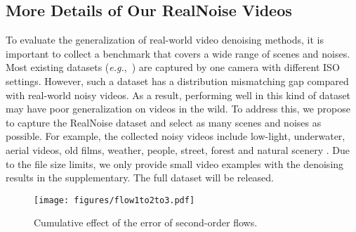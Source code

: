 \documentclass[10pt,twocolumn,letterpaper]{article}
\def\eg{\mbox{\textit{e.g.}, }}
\newlength \g
\begin{document}
\begin{table}[h!]
\caption{Generalization to different kinds of noise on REDS4.}
  \vspace{1mm}
  \label{supptab:generalization}
  \centering
\end{table}

\subsection{More Details of Our RealNoise Videos}
To evaluate the generalization of real-world video denoising methods, it is important to collect a benchmark that covers a wide range of scenes and noises. 
Most existing datasets (\eg \cite{yue2020crvd}) are captured by one camera with different ISO settings.
However, such a dataset has a distribution mismatching gap compared with real-world noisy videos.
As a result, performing well in this kind of dataset may have poor generalization on videos in the wild.
To address this, we propose to capture the RealNoise dataset and select as many scenes and noises as possible. 
For example, the collected noisy videos include low-light, underwater, aerial videos, old films, weather, people, street, forest and natural scenery \etc.
Due to the file size limits, we only provide small video examples with the denoising results in the supplementary. The full dataset will be released. 

\begin{figure}[t]
  \begin{center}
  \vspace{-3mm}
  \texttt{[image: figures/flow1to2to3.pdf]}
  \end{center}
  \vspace{-4mm}
  \caption{Cumulative effect of the error of second-order flows.}
  \label{fig:flow1to2to3}
  \vspace{-3mm}
\end{figure}
\end{document}
